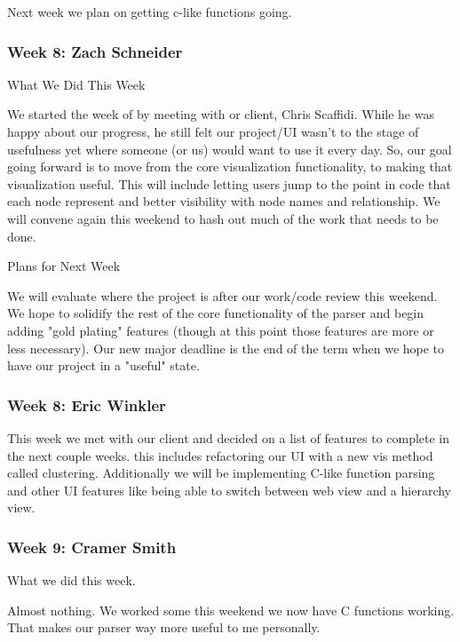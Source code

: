 Next week we plan on getting c-like functions going. \\ 

 \subsubsection{Week 8: Zach Schneider}

What We Did This Week

We started the week of by meeting with or client, Chris Scaffidi. While he was happy about our progress, he still felt our project/UI wasn't to the stage of usefulness yet where someone (or us) would want to use it every day. So, our goal going forward is to move from the core visualization functionality, to making that visualization useful. This will include letting users jump to the point in code that each node represent and better visibility with node names and relationship. We will convene again this weekend to hash out much of the work that needs to be done.



Plans for Next Week

We will evaluate where the project is after our work/code review this weekend. We hope to solidify the rest of the core functionality of the parser and begin adding "gold plating" features (though at this point those features are more or less necessary). Our new major deadline is the end of the term when we hope to have our project in a "useful" state. \\ 

 \subsubsection{Week 8: Eric Winkler}

This week we met with our client and decided on a list of features to complete in the next couple weeks. this includes refactoring our UI with a new vis method called clustering. Additionally we will be implementing C-like function parsing and  other UI features like being able to switch between web view and a hierarchy view. \\ 

 \subsubsection{Week 9: Cramer Smith}

What we did this week.



Almost nothing. We worked some this weekend we now have C functions working. That makes our parser way more useful to me personally. 




